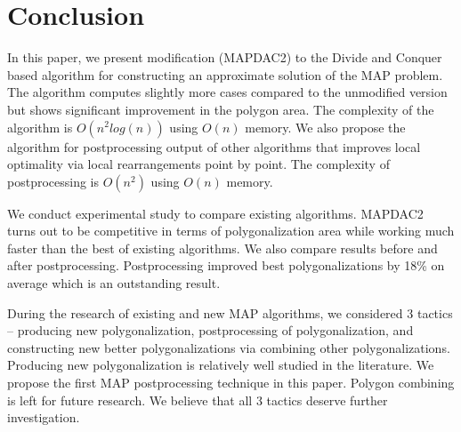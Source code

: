 \documentclass[conference]{IEEEtran}
\begin{document}
	\section{Conclusion}
	\label{S5}
		In this paper, we present modification (MAP{\textunderscore}DAC2) to the Divide and Conquer based algorithm for constructing an approximate solution of the MAP problem.
		The algorithm computes slightly more cases compared to the unmodified version but shows significant improvement in the polygon area.
		The complexity of the algorithm is $O(n^{2}log(n))$ using $O(n)$ memory.
		We also propose the algorithm for postprocessing output of other algorithms that improves local optimality via local rearrangements point by point.
		The complexity of postprocessing is $O(n^{2})$ using $O(n)$ memory.
	
		We conduct experimental study to compare existing algorithms.
		MAP{\textunderscore}DAC2 turns out to be competitive in terms of polygonalization area while working much faster than the best of existing algorithms.
		We also compare results before and after postprocessing.
		Postprocessing improved best polygonalizations by 18\% on average which is an outstanding result.
	
		During the research of existing and new MAP algorithms, we considered 3 tactics -- producing new polygonalization, postprocessing of polygonalization, and constructing new better polygonalizations via combining other polygonalizations.
		Producing new polygonalization is relatively well studied in the literature.
		We propose the first MAP postprocessing technique in this paper.
		Polygon combining is left for future research.
		We believe that all 3 tactics deserve further investigation.
	
	
\end{document}
